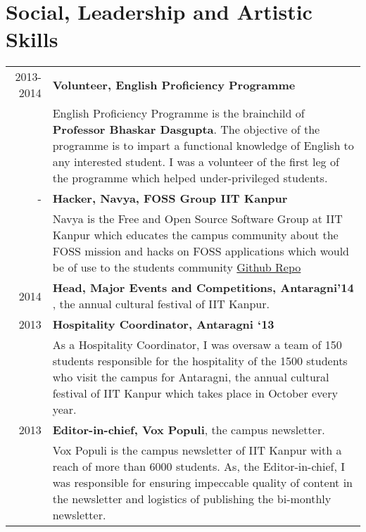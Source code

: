 \documentclass[a4paper,10pt]{article} %
\begin{document}

\section {Social, Leadership and Artistic Skills}
\begin{tabular}{rp{12cm}}

    2013-2014    & \textbf{Volunteer, English Proficiency Programme}\\
                 & \footnotesize{English Proficiency Programme is the brainchild
                    of \textbf{Professor Bhaskar Dasgupta}. The objective of the
                    programme is to impart a functional knowledge of English to
                    any interested student. I was a volunteer of the first leg
                    of the programme which helped under-privileged students.}\\

    -    & \textbf{Hacker, Navya, FOSS Group IIT Kanpur}\\
         & \footnotesize{Navya is the Free and Open Source Software Group at IIT
           Kanpur which educates the campus community about the FOSS mission and
           hacks on FOSS applications which would be of use to the students
           community \href{https://github.com/navya} {Github Repo}} \\

    2014 & \textbf{Head, Major Events and Competitions, Antaragni'14} , the annual cultural festival of
    IIT Kanpur. \\

    2013 & \textbf{Hospitality Coordinator, Antaragni ‘13}\\
         & \footnotesize{As a Hospitality Coordinator, I was oversaw a team of 150 students responsible for
            the hospitality of the 1500 students who visit the campus for Antaragni, the annual cultural festival
            of IIT Kanpur which takes place in October every year.}\\

    2013 & \textbf{Editor-in-chief, Vox Populi}, the campus newsletter. \\
         & \footnotesize{Vox Populi is the campus newsletter of IIT Kanpur with a reach of more than 6000 students.
            As, the Editor-in-chief, I was responsible for ensuring impeccable quality of content in the newsletter and
            logistics of publishing the bi-monthly newsletter.}\\


\end{tabular}
\end{document}
